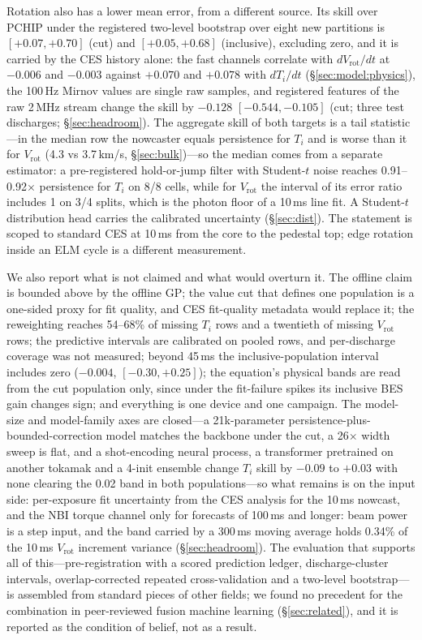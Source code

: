 \documentclass[10pt]{article}
\newcommand{\Ti}{\ensuremath{T_i}}
\newcommand{\Vrot}{\ensuremath{V_\mathrm{rot}}}
\begin{document}
Rotation also has a lower mean error, from a different source. Its skill over
PCHIP under the registered two-level bootstrap over eight new partitions is
$[+0.07, +0.70]$ (cut) and $[+0.05, +0.68]$ (inclusive), excluding zero, and it is
carried by the CES history alone: the fast channels correlate with $d\Vrot/dt$ at
$-0.006$ and $-0.003$ against $+0.070$ and $+0.078$ with $d\Ti/dt$
(\S\ref{sec:model:physics}), the 100\,Hz Mirnov values are single raw samples, and
registered features of the raw 2\,MHz stream change the skill by $-0.128$
$[-0.544, -0.105]$ (cut; three test discharges; \S\ref{sec:headroom}). The aggregate
skill of both targets is a tail statistic---in the median row the nowcaster equals
persistence for \Ti{} and is worse than it for \Vrot{} (4.3 vs 3.7\,km/s,
\S\ref{sec:bulk})---so the median comes from a separate estimator: a pre-registered
hold-or-jump filter with Student-$t$ noise reaches 0.91--0.92$\times$ persistence for \Ti{}
on 8/8 cells, while for \Vrot{} the interval of its error ratio includes 1 on 3/4
splits, which is the photon floor of a 10\,ms line fit. A Student-$t$
distribution head carries the calibrated uncertainty (\S\ref{sec:dist}). The
statement is scoped to standard CES at 10\,ms from the core to the pedestal top; edge
rotation inside an ELM cycle is a different measurement.

We also report what is not claimed and what would overturn it. The offline claim is
bounded above by the offline GP; the value cut that defines one population is a
one-sided proxy for fit quality, and CES fit-quality metadata would replace it; the
reweighting reaches 54--68\% of missing \Ti{} rows and a twentieth of missing \Vrot{}
rows; the predictive intervals are calibrated on pooled rows, and per-discharge coverage was not measured; beyond
45\,ms the inclusive-population interval includes zero ($-0.004$, $[-0.30, +0.25]$);
the equation's physical bands are read from the cut population only, since under the
fit-failure spikes its inclusive BES gain changes sign; and everything is one device
and one campaign. The model-size and model-family axes are closed---a 21k-parameter
persistence-plus-bounded-correction model matches the backbone under the cut, a
26$\times$ width sweep is flat, and a shot-encoding neural process, a transformer
pretrained on another tokamak and a 4-init ensemble change \Ti{} skill by $-0.09$ to
$+0.03$ with none clearing the 0.02 band in both populations---so what
remains is on the input side: per-exposure fit uncertainty from the CES analysis for
the 10\,ms nowcast, and the NBI torque channel only for forecasts of 100\,ms and
longer: beam power is a step input, and the band carried by a 300\,ms moving average
holds 0.34\% of the 10\,ms \Vrot{} increment variance (\S\ref{sec:headroom}). The evaluation that supports all
of this---pre-registration with a scored prediction ledger, discharge-cluster
intervals, overlap-corrected repeated cross-validation and a two-level
bootstrap---is assembled from standard pieces of other fields; we found no precedent
for the combination in peer-reviewed fusion machine learning (\S\ref{sec:related}),
and it is reported as the condition of belief, not as a result.
\end{document}
